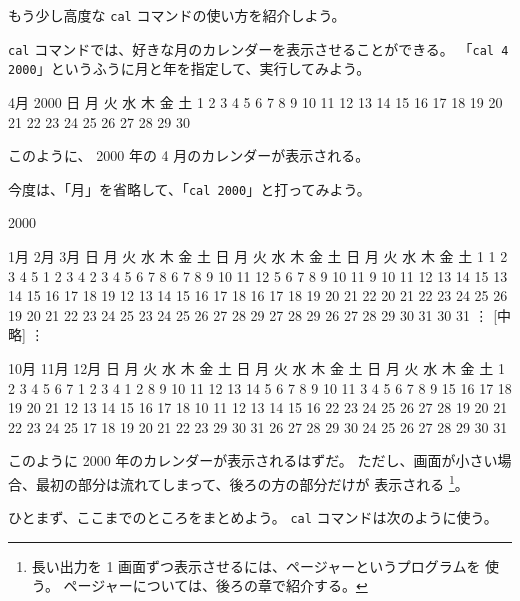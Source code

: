 もう少し高度な \texttt{cal} コマンドの使い方を紹介しよう。

 \texttt{cal} コマンドでは、好きな月のカレンダーを表示させることができる。
「\texttt{cal 4 2000}\retrn」というふうに月と年を指定して、実行してみよう。

\begin{progls}
      4月 2000
日 月 火 水 木 金 土
                   1
 2  3  4  5  6  7  8
 9 10 11 12 13 14 15
16 17 18 19 20 21 22
23 24 25 26 27 28 29
30
%
\end{progls}

このように、 2000 年の 4 月のカレンダーが表示される。


今度は、「月」を省略して、「\texttt{cal 2000}\retrn」と打ってみよう。

\begin{progls}
                             2000

        1月                   2月                   3月
日 月 火 水 木 金 土  日 月 火 水 木 金 土  日 月 火 水 木 金 土
                   1         1  2  3  4  5            1  2  3  4
 2  3  4  5  6  7  8   6  7  8  9 10 11 12   5  6  7  8  9 10 11
 9 10 11 12 13 14 15  13 14 15 16 17 18 19  12 13 14 15 16 17 18
16 17 18 19 20 21 22  20 21 22 23 24 25 26  19 20 21 22 23 24 25
23 24 25 26 27 28 29  27 28 29              26 27 28 29 30 31
30 31
                                \textrm{\vdots}
                             [中略]
                                \textrm{\vdots}

        10月                  11月                  12月
日 月 火 水 木 金 土  日 月 火 水 木 金 土  日 月 火 水 木 金 土
 1  2  3  4  5  6  7            1  2  3  4                  1  2
 8  9 10 11 12 13 14   5  6  7  8  9 10 11   3  4  5  6  7  8  9
15 16 17 18 19 20 21  12 13 14 15 16 17 18  10 11 12 13 14 15 16
22 23 24 25 26 27 28  19 20 21 22 23 24 25  17 18 19 20 21 22 23
29 30 31              26 27 28 29 30        24 25 26 27 28 29 30
                                            31
%
\end{progls}

このように 2000 年のカレンダーが表示されるはずだ。
ただし、画面が小さい場合、最初の部分は流れてしまって、後ろの方の部分だけが
表示される
\footnote{長い出力を 1 画面ずつ表示させるには、ページャーというプログラムを
使う。
ページャーについては、後ろの章で紹介する。}。

\bigskip

ひとまず、ここまでのところをまとめよう。
 \texttt{cal} コマンドは次のように使う。

